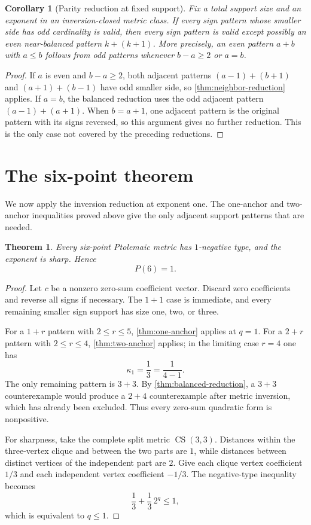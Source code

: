 \documentclass[11pt]{amsart}
\newtheorem{theorem}{Theorem}[section]
\newtheorem{corollary}[corollary]{Corollary}
\theoremstyle{definition}
\theoremstyle{remark}
\newcommand{\CS}{\operatorname{CS}}
\begin{document}
\begin{corollary}[Parity reduction at fixed support]\label{cor:parity-support}
Fix a total support size and an exponent in an inversion-closed metric class.
If every sign pattern whose smaller side has odd cardinality is valid, then
every sign pattern is valid except possibly an even near-balanced pattern
$k+(k+1)$.  More precisely, an even pattern $a+b$ with $a\le b$ follows
from odd patterns whenever $b-a\ge2$ or $a=b$.
\end{corollary}

\begin{proof}
If $a$ is even and $b-a\ge2$, both adjacent patterns
$(a-1)+(b+1)$ and $(a+1)+(b-1)$ have odd smaller side, so
\cref{thm:neighbor-reduction} applies.  If $a=b$, the balanced reduction
uses the odd adjacent pattern $(a-1)+(a+1)$.  When $b=a+1$, one adjacent pattern is the original pattern with its signs
reversed, so this argument gives no further reduction. This is the only case
not covered by the preceding reductions.
\end{proof}



\section{The six-point theorem}

We now apply the inversion reduction at exponent one.  The one-anchor and
two-anchor inequalities proved above give the only adjacent support patterns
that are needed.

\begin{theorem}\label{thm:P6}
Every six-point Ptolemaic metric has $1$-negative type, and the exponent is
sharp.  Hence
\[
 \boxed{P(6)=1.}
\]
\end{theorem}

\begin{proof}
Let $c$ be a nonzero zero-sum coefficient vector.  Discard zero
coefficients and reverse all signs if necessary. The $1+1$ case is
immediate, and every remaining smaller sign support has size one, two,
or three.

For a $1+r$ pattern with $2\le r\le5$, \cref{thm:one-anchor} applies at
$q=1$.  For a $2+r$ pattern with $2\le r\le4$,
\cref{thm:two-anchor} applies; in the limiting case $r=4$ one has
\[
 \kappa_1=\frac13=\frac1{4-1}.
\]
The only remaining pattern is $3+3$.  By
\cref{thm:balanced-reduction}, a $3+3$ counterexample would produce a
$2+4$ counterexample after metric inversion, which has already been
excluded.  Thus every zero-sum quadratic form is nonpositive.

For sharpness, take the complete split metric $\CS(3,3)$. Distances
within the three-vertex clique and between the two parts are $1$, while
distances between distinct vertices of the independent part are $2$.
Give each clique vertex coefficient $1/3$ and each independent vertex
coefficient $-1/3$.
The negative-type inequality becomes
\[
 \frac13+\frac13\,2^q\le1,
\]
which is equivalent to $q\le1$.
\end{proof}
\end{document}
